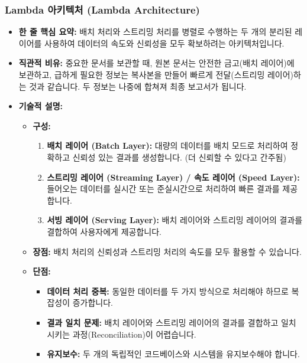 \documentclass[11pt,a4paper]{article}
\theoremstyle{definition}
\begin{document}
\subsubsection{Lambda 아키텍처 (Lambda Architecture)}
\begin{itemize}
    \item \textbf{한 줄 핵심 요약:} 배치 처리와 스트리밍 처리를 병렬로 수행하는 두 개의 분리된 레이어를 사용하여 데이터의 속도와 신뢰성을 모두 확보하려는 아키텍처입니다.
    \item \textbf{직관적 비유:} 중요한 문서를 보관할 때, 원본 문서는 안전한 금고(배치 레이어)에 보관하고, 급하게 필요한 정보는 복사본을 만들어 빠르게 전달(스트리밍 레이어)하는 것과 같습니다. 두 정보는 나중에 합쳐져 최종 보고서가 됩니다.
    \item \textbf{기술적 설명:}
    \begin{itemize}
        \item \textbf{구성:}
        \begin{enumerate}
            \item \textbf{배치 레이어 (Batch Layer):} 대량의 데이터를 배치 모드로 처리하여 정확하고 신뢰성 있는 결과를 생성합니다. (더 신뢰할 수 있다고 간주됨)
            \item \textbf{스트리밍 레이어 (Streaming Layer) / 속도 레이어 (Speed Layer):} 들어오는 데이터를 실시간 또는 준실시간으로 처리하여 빠른 결과를 제공합니다.
            \item \textbf{서빙 레이어 (Serving Layer):} 배치 레이어와 스트리밍 레이어의 결과를 결합하여 사용자에게 제공합니다.
        \end{enumerate}
        \item \textbf{장점:} 배치 처리의 신뢰성과 스트리밍 처리의 속도를 모두 활용할 수 있습니다.
        \item \textbf{단점:}
        \begin{itemize}
            \item \textbf{데이터 처리 중복:} 동일한 데이터를 두 가지 방식으로 처리해야 하므로 복잡성이 증가합니다.
            \item \textbf{결과 일치 문제:} 배치 레이어와 스트리밍 레이어의 결과를 결합하고 일치시키는 과정(Reconciliation)이 어렵습니다.
            \item \textbf{유지보수:} 두 개의 독립적인 코드베이스와 시스템을 유지보수해야 합니다.
        \end{itemize}
    \end{itemize}
\end{itemize}
\end{document}
